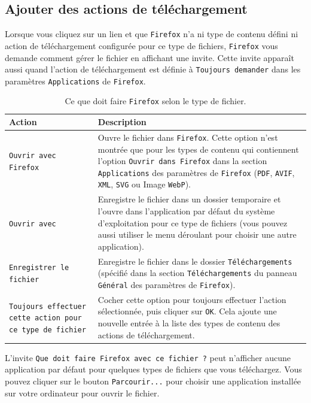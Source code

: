 \documentclass[a4paper,11pt]{book}
\begin{document}
\subsection*{Ajouter des actions de téléchargement}
Lorsque vous cliquez sur un lien et que \texttt{Firefox} n’a ni type de contenu défini ni action de téléchargement configurée pour ce type de fichiers, \texttt{Firefox} vous demande comment gérer le fichier en affichant une invite. Cette invite apparaît aussi quand l’action de téléchargement est définie à \texttt{Toujours demander} dans les paramètres \texttt{Applications} de \texttt{Firefox}. 
\medskip

\begin{table}[!h]
\begin{center}
\begin{tabular}{|p{2.5cm}|p{9.5cm}|}
\hline
\textbf{Action} & \textbf{Description}\\
\hline
\texttt{Ouvrir avec Firefox} & Ouvre le fichier dans \texttt{Firefox}. Cette option n’est montrée que pour les types de contenu qui contiennent l’option \texttt{Ouvrir dans Firefox} dans la section \texttt{Applications} des paramètres de \texttt{Firefox} (\texttt{PDF}, \texttt{AVIF}, \texttt{XML}, \texttt{SVG} ou Image \texttt{WebP}).\\
\hline
\texttt{Ouvrir avec} & Enregistre le fichier dans un dossier temporaire et l’ouvre dans l’application par défaut du système d’exploitation pour ce type de fichiers (vous pouvez aussi utiliser le menu déroulant pour choisir une autre application).\\
\hline
\texttt{Enregistrer le fichier} & Enregistre le fichier dans le dossier \texttt{Téléchargements} (spécifié dans la section \texttt{Téléchargements} du panneau \texttt{Général} des paramètres de \texttt{Firefox}).\\
\hline
\texttt{Toujours effectuer cette action pour ce type de fichier} & Cocher cette option pour toujours effectuer l’action sélectionnée, puis cliquer sur \texttt{OK}. Cela ajoute une nouvelle entrée à la liste des types de contenu des actions de téléchargement.\\
\hline  
\end{tabular}
\caption{Ce que doit faire \texttt{Firefox} selon le type de fichier.}
\end{center}
\end{table}
\medskip

L’invite \texttt{Que doit faire Firefox avec ce fichier ?} peut n’afficher aucune application par défaut pour quelques types de fichiers que vous téléchargez. Vous pouvez cliquer sur le bouton \texttt{Parcourir...} pour choisir une application installée sur votre ordinateur pour ouvrir le fichier.
\medskip
\end{document}
